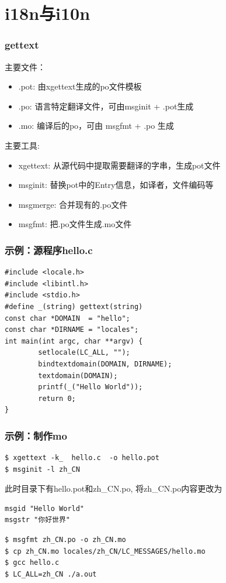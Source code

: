 \documentclass[compress]{beamer}
\begin{document}
\section{i18n与i10n}

\begin{frame}
	\frametitle{gettext}
主要文件：
\begin{itemize}
	\item .pot: 由xgettext生成的po文件模板
	\item .po: 语言特定翻译文件，可由msginit + .pot生成
	\item .mo: 编译后的po，可由 msgfmt + .po 生成
\end{itemize}
主要工具:
\begin{itemize}
	\item xgettext: 从源代码中提取需要翻译的字串，生成pot文件
	\item msginit: 替换pot中的Entry信息，如译者，文件编码等
	\item msgmerge: 合并现有的.po文件
	\item msgfmt: 把.po文件生成.mo文件
\end{itemize}
\end{frame}

\begin{frame}[fragile]
	\frametitle{示例：源程序hello.c}
\begin{lstlisting}
#include <locale.h>
#include <libintl.h>
#include <stdio.h>
#define _(string) gettext(string)
const char *DOMAIN  = "hello";
const char *DIRNAME = "locales";
int main(int argc, char **argv) {
        setlocale(LC_ALL, "");
        bindtextdomain(DOMAIN, DIRNAME);
        textdomain(DOMAIN);
        printf(_("Hello World"));
        return 0;
}
\end{lstlisting}

\end{frame}

\begin{frame}[fragile]
\frametitle{示例：制作mo}

\begin{verbatim}
$ xgettext -k_  hello.c  -o hello.pot
$ msginit -l zh_CN
\end{verbatim}
此时目录下有hello.pot和zh\_CN.po, 将zh\_CN.po内容更改为
\begin{Verbatim}
msgid "Hello World"
msgstr "你好世界"
\end{Verbatim}
\begin{verbatim}
$ msgfmt zh_CN.po -o zh_CN.mo
$ cp zh_CN.mo locales/zh_CN/LC_MESSAGES/hello.mo
$ gcc hello.c
$ LC_ALL=zh_CN ./a.out
\end{verbatim}

\end{frame}
\end{document}
